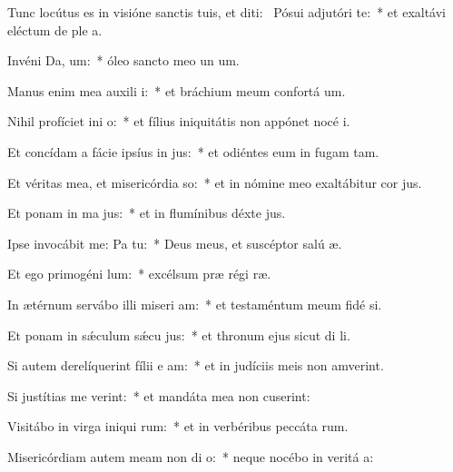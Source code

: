 \item Tunc locútus es in visióne sanctis tuis, et diti:~\pscross{} Pósui adjutóri  te:~* et exaltávi eléctum de ple a.
\item Invéni Da,  um:~* óleo sancto meo un um.
\item Manus enim mea auxili i:~* et bráchium meum confortá um.
\item Nihil profíciet ini  o:~* et fílius iniquitátis non appónet nocé i.
\item Et concídam a fácie ipsíus in jus:~* et odiéntes eum in fugam tam.
\item Et véritas mea, et misericórdia   so:~* et in nómine meo exaltábitur cor jus.
\item Et ponam in ma  jus:~* et in flumínibus déxte jus.
\item Ipse invocábit me: Pa   tu:~* Deus meus, et suscéptor salú æ.
\item Et ego primogéni  lum:~* excélsum præ régi ræ.
\item In ætérnum servábo illi miseri am:~* et testaméntum meum fidé si.
\item Et ponam in sǽculum sǽcu  jus:~* et thronum ejus sicut di li.
\item Si autem derelíquerint fílii e  am:~* et in judíciis meis non amverint.
\item Si justítias me verint:~* et mandáta mea non cuserint:
\item Visitábo in virga iniqui rum:~* et in verbéribus peccáta rum.
\item Misericórdiam autem meam non di  o:~* neque nocébo in veritá a:
